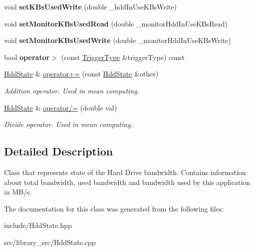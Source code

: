 \begin{DoxyCompactItemize}
\item 
void {\bfseries set\+K\+Bs\+Used\+Write} (double \+\_\+hdd\+In\+Use\+K\+Bs\+Write)\hypertarget{classHddState_acae5c83d3cf83afa0dbcaf88b30ce67f}{}\label{classHddState_acae5c83d3cf83afa0dbcaf88b30ce67f}

\item 
void {\bfseries set\+Monitor\+K\+Bs\+Used\+Read} (double \+\_\+monitor\+Hdd\+In\+Use\+K\+Bs\+Read)\hypertarget{classHddState_a577573f55afe777aff67c4fd07ddd6d8}{}\label{classHddState_a577573f55afe777aff67c4fd07ddd6d8}

\item 
void {\bfseries set\+Monitor\+K\+Bs\+Used\+Write} (double \+\_\+monitor\+Hdd\+In\+Use\+K\+Bs\+Write)\hypertarget{classHddState_a4daae6dc429d04daee5b3332909ae001}{}\label{classHddState_a4daae6dc429d04daee5b3332909ae001}

\item 
bool {\bfseries operator$>$} (const \hyperlink{structTriggerType}{Trigger\+Type} \&trigger\+Type) const \hypertarget{classHddState_a6de8b96115f4b7cae9cab8c87a98aadd}{}\label{classHddState_a6de8b96115f4b7cae9cab8c87a98aadd}

\item 
\hyperlink{classHddState}{Hdd\+State} \& \hyperlink{classHddState_a19295031a2c076b9f02c40c3a3ae2319}{operator+=} (const \hyperlink{classHddState}{Hdd\+State} \&other)\hypertarget{classHddState_a19295031a2c076b9f02c40c3a3ae2319}{}\label{classHddState_a19295031a2c076b9f02c40c3a3ae2319}

\begin{DoxyCompactList}\small\item\em Addition operator. Used in mean computing. \end{DoxyCompactList}\item 
\hyperlink{classHddState}{Hdd\+State} \& \hyperlink{classHddState_af2c42584f8d88f34860677da7b73a460}{operator/=} (double val)\hypertarget{classHddState_af2c42584f8d88f34860677da7b73a460}{}\label{classHddState_af2c42584f8d88f34860677da7b73a460}

\begin{DoxyCompactList}\small\item\em Divide operator. Used in mean computing. \end{DoxyCompactList}\end{DoxyCompactItemize}


\subsection{Detailed Description}
Class that represents state of the Hard Drive bandwidth. Contains information about total bandwidth, used bandwidth and bandwidth used by this application in M\+B/s. 

The documentation for this class was generated from the following files\+:\begin{DoxyCompactItemize}
\item 
include/Hdd\+State.\+hpp\item 
src/library\+\_\+src/Hdd\+State.\+cpp\end{DoxyCompactItemize}
